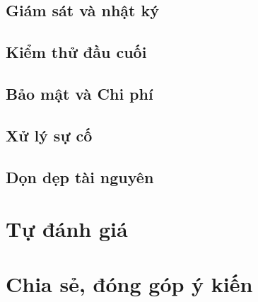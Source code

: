 \subsection{Giám sát và nhật ký}


\subsection{Kiểm thử đầu cuối}


\subsection{Bảo mật và Chi phí}


\subsection{Xử lý sự cố}


\subsection{Dọn dẹp tài nguyên}


\newpage

\section{Tự đánh giá}



\newpage

\section{Chia sẻ, đóng góp ý kiến}



\newpage

